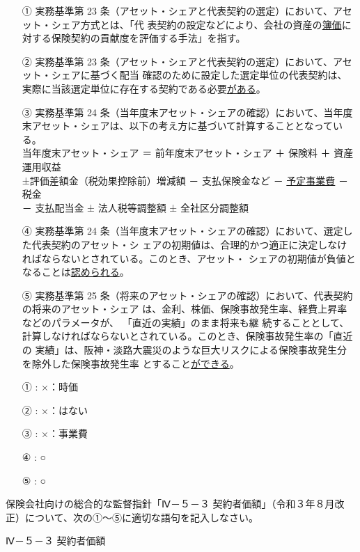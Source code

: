 \documentclass[report,gutter=10mm,fore-edge=10mm,uplatex,dvipdfmx]{jlreq}
\begin{document}
\begin{itemize}
 \item [①] 実務基準第 23 条（アセット・シェアと代表契約の選定）において、アセット・シェア方式とは、「代
表契約の設定などにより、会社の資産の\underline{簿価}に対する保険契約の貢献度を評価する手法」を指す。
 \item [②] 実務基準第 23 条（アセット・シェアと代表契約の選定）において、アセット・シェアに基づく配当
確認のために設定した選定単位の代表契約は、実際に当該選定単位に存在する契約である必要\underline{がある}。
\item[③] 実務基準第 24 条（当年度末アセット・シェアの確認）において、当年度末アセット・シェアは、以下の考え方に基づいて計算することとなっている。\\
当年度末アセット・シェア ＝ 前年度末アセット・シェア ＋ 保険料 ＋ 資産運用収益\\
±評価差額金（税効果控除前）増減額 － 支払保険金など － \underline{予定事業費} － 税金\\
－ 支払配当金 ± 法人税等調整額 ± 全社区分調整額
\item[④] 実務基準第 24 条（当年度末アセット・シェアの確認）において、選定した代表契約のアセット・シ
ェアの初期値は、合理的かつ適正に決定しなければならないとされている。このとき、アセット・
シェアの初期値が負値となることは\underline{認められる}。
\item[⑤] 実務基準第 25 条（将来のアセット・シェアの確認）において、代表契約の将来のアセット・シェア
は、金利、株価、保険事故発生率、経費上昇率などのパラメータが、
「直近の実績」のまま将来も継
続することとして、計算しなければならないとされている。このとき、保険事故発生率の「直近の
実績」は、阪神・淡路大震災のような巨大リスクによる保険事故発生分を除外した保険事故発生率
とすること\underline{ができる}。
\end{itemize}
\answer{}
\begin{itemize}
\item[ ① : ]  ×：時価 
\item[ ② : ]  ×：はない 
\item[ ③ : ]  ×：事業費 
\item[ ④ : ]  ○ 
\item[ ⑤ : ]  ○
\end{itemize}


保険会社向けの総合的な監督指針「Ⅳ－５－３ 契約者価額」（令和３年８月改正）について、次の①～⑤に適切な語句を記入しなさい。

Ⅳ－５－３ 契約者価額
\end{document}
